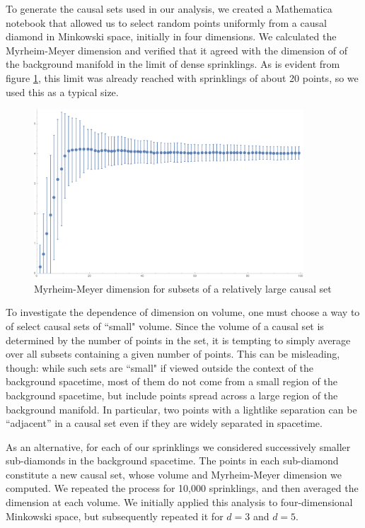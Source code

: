 \documentclass[12pt]{article}
\makeatletter
\def\section{\@startsection{section}{1}{\z@}{3.5ex plus 1ex minus
   .2ex}{2.3ex plus .2ex}{\large\bf}}
\makeatother
\begin{document}
\section{Approach}

To generate the causal sets used in our analysis, we created a Mathematica notebook
 that allowed us to select random points uniformly from a causal diamond in
Minkowski space, initially in four dimensions.   We calculated the Myrheim-Meyer dimension
and verified that it agreed with the dimension of of the background manifold in the  limit
of dense sprinklings.  As is evident from figure \ref{fig1}, this limit was already reached
with sprinklings of about 20 points, so we used this as a typical size.

\begin{figure}
\begin{center}
\includegraphics[height=2.5in]{CSDimRedLrg.pdf}
\caption{Myrheim-Meyer dimension for subsets of a relatively large causal set \label{fig1}}
\end{center}
\end{figure}

To investigate the dependence of dimension on volume, one must choose a way to
of select causal sets of ``small" volume.  Since the volume of a causal set is
determined by the number of points in the set, it is tempting to simply average
over all subsets containing a given number of points.  This can be misleading, though:
while such sets are ``small" if viewed outside the context of the background
spacetime, most of them do not come from a small region of the background spacetime,
but include points spread across a large region of the background manifold.   In
particular, two points with a lightlike separation can be ``adjacent'' in a causal set
even if they are widely separated in spacetime.

As an alternative, for each of our sprinklings we considered successively smaller sub-diamonds
in the background spacetime.  The points in each sub-diamond constitute a new causal
set, whose volume and Myrheim-Meyer dimension we computed.  We repeated the
process for 10,000 sprinklings, and then averaged the dimension at
each volume.  We initially applied this analysis to four-dimensional Minkowski space,
but subsequently repeated it for $d=3$ and $d=5$.
\end{document}
